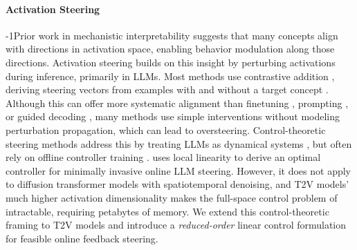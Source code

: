 \documentclass{article}
\begin{document}
\paragraph{Activation Steering}
\looseness-1Prior work in mechanistic interpretability \cite{bereska2024mechanistic, Elhage_Hume_Olsson_2022, mikolov2013linguistic, park2023linear, marks2024the, nanda2023emergent} suggests that many concepts align with directions in activation space, enabling behavior modulation along those directions. Activation steering builds on this insight by perturbing activations during inference, primarily in LLMs. Most methods use contrastive addition \cite{Dathathri2020Plug}, deriving steering vectors from examples with and without a target concept \cite{li2023inference, turner2024activation, Arditi_Obeso_Syed_Paleka_Panickssery_Gurnee_Nanda_2024a, Rimsky_Gabrieli_Schulz_Tong_Hubinger_Turner_2024, Li_Patel_Viégas_Pfister_Wattenberg_2024, Turner_Thiergart_Leech_Udell_Vazquez_Mini_MacDiarmid_2024}. Although this can offer more systematic alignment than finetuning \cite{stiennon2020learning, touvron2023llama, rafailov2023direct, xu2024contrastive, yuan2023rrhf, song2024preference, houlsby2019parameter}, prompting \cite{askell2021general, zhang2023defending}, or guided decoding \cite{khanov2024args, huang2025deal}, many methods use simple interventions \cite{Turner_Thiergart_Leech_Udell_Vazquez_Mini_MacDiarmid_2024, Rodriguez_Blaas_Klein_Zappella_Apostoloff_Cuturi_Suau_2024, wu2024reft, wu2024advancing, Vu_Nguyen_2025} without modeling perturbation propagation, which can lead to oversteering. 
Control-theoretic steering methods address this by treating LLMs as dynamical systems \cite{bhargava2023s}, but often rely on offline controller training \cite{Kong_Wang_Mu_Du_Zhuang_Zhou_Song_Zhang_Wang_Zhang_2024, Karnik_Bansal_2025, Cheng_Alonso_2025, Hedstrom_Amoukou_Bewley, tan2024analysing, scalena2024multi, ode_activation_steering, miyaoka2024cbf, Nguyen_Vu_Pham_Zhang_Nguyen_2025}. \cite{skifstad2026local} uses local linearity to derive an optimal controller for minimally invasive online LLM steering. However, it does not apply to diffusion transformer models with spatiotemporal denoising, and T2V models’ much higher activation dimensionality makes the full-space control problem of \cite{skifstad2026local} intractable, requiring petabytes of memory. We extend this control-theoretic framing to T2V models and introduce a \textit{reduced-order} linear control formulation for feasible online feedback steering. 


\vspace{-10pt}
\end{document}
